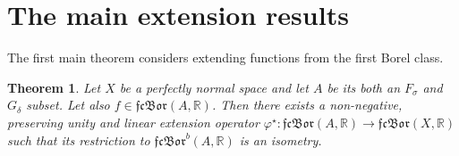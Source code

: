 \documentclass{amsart}
\newtheorem{Th}{Theorem}
\theoremstyle{definition}
\newcommand\mR{{\mathbb R}}
\newcommand\cn{\colon}
\newcommand\ol{\overline}
\newcommand\fs{F_\sigma}
\newcommand\gd{G_\delta}
\newcommand\fcb{\mathfrak{fcBor}}
\newcommand\fii{{\varphi}}
\begin{document}
\section{The main extension results}
The first main theorem considers extending functions from the first Borel class.

\begin{Th}\label{rozsz_fcb}
Let $X$ be a perfectly normal space and let $A$ be its both an $\fs$ and $\gd$ subset. Let also $f\in\fcb(A,\mR)$. Then
there exists a non-negative, preserving unity and linear extension operator $\fii^\star\cn\fcb(A,\mR)\to\fcb(X,\mR)$ such that its restriction to
$\fcb^b(A,\mR)$ is an isometry.
\end{Th}
\begin{comment}
\begin{proof}
Set $\fii^\star(f)=f\circ\fii$, where $\fii$ is an algebraic retraction given by 
$$
\varphi(x)=\left\{\begin{array}{lll}
x & \textrm{:} & x\in A, \\
x_0 & \textrm{:} & x\in X\setminus A,
\end{array} \right.
$$
where $x_0$ is a fixed point from $A$. Then $\fii$ (by Lemma \ref{funkcja fi}) is a first level Borel class
and (by \cite[Theorems B and D]{KM}) the composition $f\circ\fii$ remains of the first Borel (Baire) class in this case.
$\fii^{\star}$ is of course an extension of $f$. Its linearity and preserving of the unity are obvious.
Furthermore, if $f$ is a bounded element of $\fcb(A)$, we have
$$
\|\fii^{\star}(f)\|_X=\sup_{x\in X}|f\left(\fii(x)\right)|=\sup_{a\in A}|f(a)|=\|f\|_A.
$$
\end{proof}
\end{comment}
\end{document}
